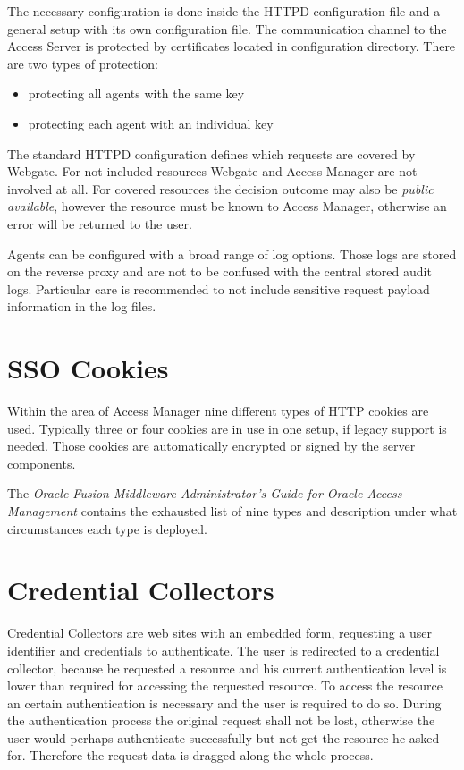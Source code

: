 \documentclass[11pt]{report}
\begin{document}
The necessary configuration is done inside the HTTPD configuration file
and a general setup with its own configuration file. The communication
channel to the Access Server is protected by certificates located in
configuration directory. There are two types of protection:

\begin{itemize}
    \item protecting all agents with the same key
    \item protecting each agent with an individual key
\end{itemize}

The standard HTTPD configuration defines which requests are covered by
Webgate.  For not included resources Webgate and Access Manager are not
involved at all.  For covered resources the decision outcome may also be
\emph{public available}, however the resource must be known to Access
Manager, otherwise an error will be returned to the user.

Agents can be configured with a broad range of log options. Those logs
are stored on the reverse proxy and are not to be confused with the
central stored audit logs. Particular care is recommended to not include 
sensitive request payload information in the log files.


\section{SSO Cookies}

Within the area of Access Manager nine different types of HTTP cookies
are used. Typically three or four cookies are in use in one setup,
if legacy support is needed. Those cookies are automatically encrypted
or signed by the server components.

The \emph{Oracle Fusion Middleware Administrator's Guide for Oracle Access
Management} contains the exhausted list of nine types and description
under what circumstances each type is deployed.



\section{Credential Collectors}

Credential Collectors are web sites with an embedded form, requesting a
user identifier and  credentials to authenticate. The user is redirected
to a credential collector, because he requested a resource and his
current authentication level is lower than required for accessing the
requested resource. To access the resource an certain authentication is
necessary and the user is required to do so. During the authentication
process the original request shall not be lost, otherwise the user would
perhaps authenticate successfully but not get the resource he asked for.
Therefore the request data is dragged along the whole process.
\end{document}
